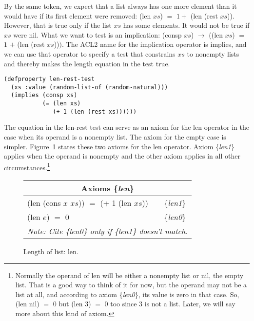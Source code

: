 By the same token, we expect that a list always
has one more element than it would have if
its first element were removed: \textsf{(len $xs$)} $=$ $1 +$ \textsf{(len (rest $xs$))}.
However, that is true only if the list $xs$
has some elements. It would not be true if $xs$ were \textsf{nil}.
What we want to test is an implication:
\textsf{(consp $xs$)} $\rightarrow$ (\textsf{(len $xs$)} $=$ $1$ $+$ \textsf{(len (rest $xs$))}$)$.
The ACL2 name for the implication operator is \textsf{implies},
and we can use that operator to specify a test that
constrains $xs$ to nonempty lists and thereby
makes the length equation in the test true.

\begin{code}
\begin{verbatim}
(defproperty len-rest-test
  (xs :value (random-list-of (random-natural)))
  (implies (consp xs)
           (= (len xs)
              (+ 1 (len (rest xs))))))
\end{verbatim}
\end{code}

The equation in the len-rest test can serve
as an axiom for the \textsf{len} operator in the case
when its operand is a nonempty list.
The axiom for the empty case is simpler.
Figure~\ref{fig:len-axioms} states these two axioms for
the len operator. Axiom \{\emph{len1}\} applies when
the operand is nonempty and the other axiom
applies in all other circumstances.\footnote{Normally
the operand of len will be either a nonempty list or nil, the empty list.
That is a good way to think of it for now,
but the operand may not be a list at all,
and according to axiom \{\emph{len0}\}, its value is zero in that case.
So, \textsf{(len nil)} $=$ $0$ but \textsf{(len $3$)} $=$ $0$ too since
$3$ is not a list. Later, we will say more about this kind of axiom.}

\begin{figure}
\begin{tabular}{ll}
\multicolumn{2}{c}{Axioms \{\emph{len}\}} \\
\hline
\textsf{(len (cons $x$ $xs$))} $=$ \textsf{(+ 1 (len $xs$))} & \{\emph{len1}\} \\
\textsf{(len $e$)} $=$ 0                            & \{\emph{len0}\} \\
\multicolumn{2}{c}{\emph{Note: Cite \{\emph{len0}\} only if \{\emph{len1}\} doesn't match.}}\\
\end{tabular}
\caption{Length of list: \textsf{len}.}
\label{len-equations}\label{fig:len-axioms}
\end{figure}


